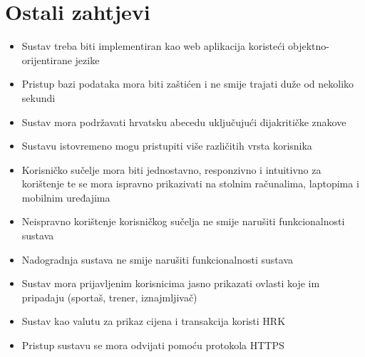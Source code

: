 		\section{Ostali zahtjevi}
		

			
			\begin{itemize}
				\setlength{\itemsep}{0pt}
				\setlength{\parskip}{0pt}
				\item Sustav treba biti implementiran kao web aplikacija koristeći objektno-orijentirane jezike
				\item Pristup bazi podataka mora biti zaštićen i ne smije trajati duže od nekoliko sekundi
				\item Sustav mora podržavati hrvatsku abecedu uključujući dijakritičke znakove
				\item Sustavu istovremeno mogu pristupiti više različitih vrsta korisnika
				\item Korisničko sučelje mora biti jednostavno, responzivno i intuitivno za korištenje te se mora ispravno prikazivati na stolnim računalima, laptopima i mobilnim uređajima
				\item Neispravno korištenje korisničkog sučelja ne smije narušiti funkcionalnosti sustava
				\item Nadogradnja sustava ne smije narušiti funkcionalnosti sustava
				\item Sustav mora prijavljenim korisnicima jasno prikazati ovlasti koje im pripadaju (sportaš, trener, iznajmljivač)
				\item Sustav kao valutu za prikaz cijena i transakcija koristi HRK
				\item Pristup sustavu se mora odvijati pomoću protokola HTTPS
			\end{itemize}
			
			 
			 
			 
	